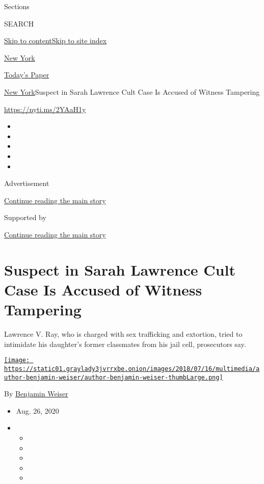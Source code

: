 Sections

SEARCH

\protect\hyperlink{site-content}{Skip to
content}\protect\hyperlink{site-index}{Skip to site index}

\href{https://www.nytimes3xbfgragh.onion/section/nyregion}{New York}

\href{https://myaccount.nytimes3xbfgragh.onion/auth/login?response_type=cookie\&client_id=vi}{}

\href{https://www.nytimes3xbfgragh.onion/section/todayspaper}{Today's
Paper}

\href{/section/nyregion}{New York}\textbar{}Suspect in Sarah Lawrence
Cult Case Is Accused of Witness Tampering

\url{https://nyti.ms/2YAaH1y}

\begin{itemize}
\item
\item
\item
\item
\item
\end{itemize}

Advertisement

\protect\hyperlink{after-top}{Continue reading the main story}

Supported by

\protect\hyperlink{after-sponsor}{Continue reading the main story}

\hypertarget{suspect-in-sarah-lawrence-cult-case-is-accused-of-witness-tampering}{%
\section{Suspect in Sarah Lawrence Cult Case Is Accused of Witness
Tampering}\label{suspect-in-sarah-lawrence-cult-case-is-accused-of-witness-tampering}}

Lawrence V. Ray, who is charged with sex trafficking and extortion,
tried to intimidate his daughter's former classmates from his jail cell,
prosecutors say.

\href{https://www.nytimes3xbfgragh.onion/by/benjamin-weiser}{\texttt{[image: https://static01.graylady3jvrrxbe.onion/images/2018/07/16/multimedia/author-benjamin-weiser/author-benjamin-weiser-thumbLarge.png]}}

By \href{https://www.nytimes3xbfgragh.onion/by/benjamin-weiser}{Benjamin
Weiser}

\begin{itemize}
\item
  Aug. 26, 2020
\item
  \begin{itemize}
  \item
  \item
  \item
  \item
  \item
  \end{itemize}
\end{itemize}


